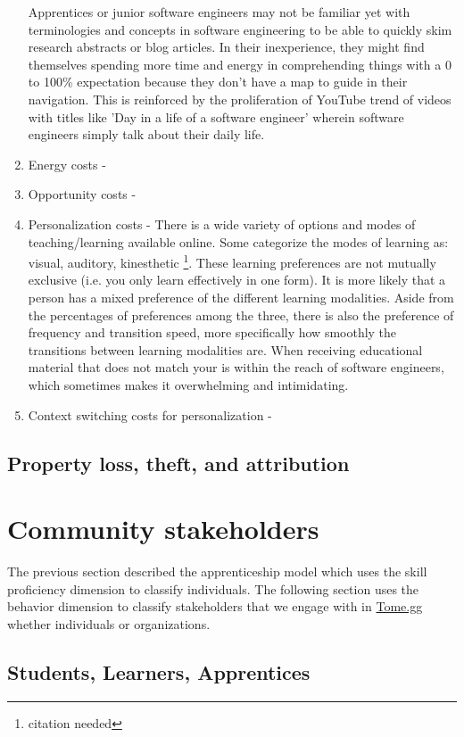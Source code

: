 \documentclass[journal, onecolumn]{IEEEtran}
\newcommand{\tomegg}{
  \href{http://tome.gg}{Tome.gg}
}
\begin{document}
\begin{enumerate}
  Apprentices or junior software engineers may not be familiar yet with terminologies
  and concepts in software engineering to be able to quickly skim research abstracts or
  blog articles. In their inexperience, they might find themselves spending more time and
  energy in comprehending things with a 0 to 100\% expectation because they don't have a map to guide in 
  their navigation. This is reinforced by the proliferation of YouTube trend
  of videos with titles like 'Day in a life of a  software engineer' wherein
  software engineers simply talk about their daily life.
  \item Energy costs - 
  \item Opportunity costs - 
  \item Personalization costs - There is a wide variety of options and modes 
  of teaching/learning available online. Some categorize the modes of learning as:
  visual, auditory, kinesthetic \footnote{citation needed}. These learning 
  preferences are not mutually exclusive (i.e. you only learn effectively in one
  form). It is more likely that a person has a mixed preference of the different
  learning modalities. Aside from the percentages of preferences among the three,
  there is also the preference of frequency and transition speed, more specifically
  how smoothly the transitions
  between learning modalities are. When receiving 
  educational material that does not match your  is within the reach of 
  software engineers, which sometimes makes it overwhelming and intimidating. 
  \item Context switching costs for personalization - 
\end{enumerate}

\subsection{Property loss, theft, and attribution}

\section{Community stakeholders}
\label{sec:stakeholders}

The previous section described the apprenticeship model which uses the 
skill proficiency dimension to classify individuals.
The following section uses the behavior dimension to classify stakeholders
that we engage with in \tomegg whether individuals or organizations.

\subsection{Students, Learners, Apprentices}
\end{document}
